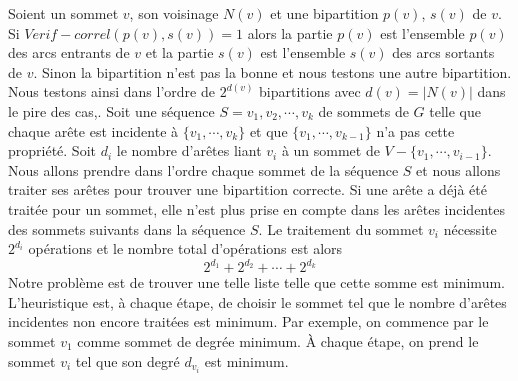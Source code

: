  Soient 
 un sommet $v$, 
 son voisinage $N(v)$ et 
 une bipartition $p(v)$, $s(v)$ de $v$.
 \newline
 Si $Verif-correl (p(v), s(v)) = 1$ alors la partie $p(v)$ est l'ensemble $p(v)$ des arcs entrants de $v$ et  la partie $s(v)$ est l'ensemble $s(v)$ des arcs sortants de $v$.    
Sinon la bipartition n'est pas la bonne et nous testons une autre bipartition.
Nous testons ainsi dans l'ordre de $2^{d(v)}$ bipartitions avec $d(v) = |N(v)|$ dans le pire des cas,.
\newline
Soit une s\'equence $S = v_1, v_2, \cdots, v_k$ de sommets de $G$ telle que 
chaque ar\^ete est incidente \`a $\{v_1, \cdots, v_k\}$ et que  $\{v_1, \cdots, v_{k-1}\}$ n'a pas cette propri\'et\'e.
\newline
Soit $d_i$ le nombre d'ar\^etes liant $v_i$ \`a un sommet  de $V-\{v_1,\cdots, v_{i-1}\}$.
\newline
Nous allons prendre dans l'ordre chaque sommet de la s\'equence $S$ et nous allons traiter ses ar\^etes pour trouver une bipartition correcte.
Si une ar\^ete a d\'ej\`a \'et\'e trait\'ee pour un sommet, elle n'est plus prise en compte dans les ar\^etes incidentes des sommets suivants dans la s\'equence $S$.
Le traitement du sommet $v_i$ n\'ecessite $2^{d_i}$ op\'erations et le nombre total d'op\'erations est alors 
$$
 2^{d_1} + 2^{d_2} + \cdots + 2^{d_k}
$$  
Notre probl\`eme  est de trouver une telle liste telle que cette somme est minimum.
L'heuristique est, \`a chaque \'etape, de choisir le sommet tel que 
le nombre d'ar\^etes incidentes non encore trait\'ees est minimum.
Par exemple, on commence par le sommet $v_1$ comme sommet de degr\'ee minimum. 
\`A chaque \'etape, on prend le sommet $v_i$ tel que son degr\'e $d_{v_i}$ est minimum.
\newline 

